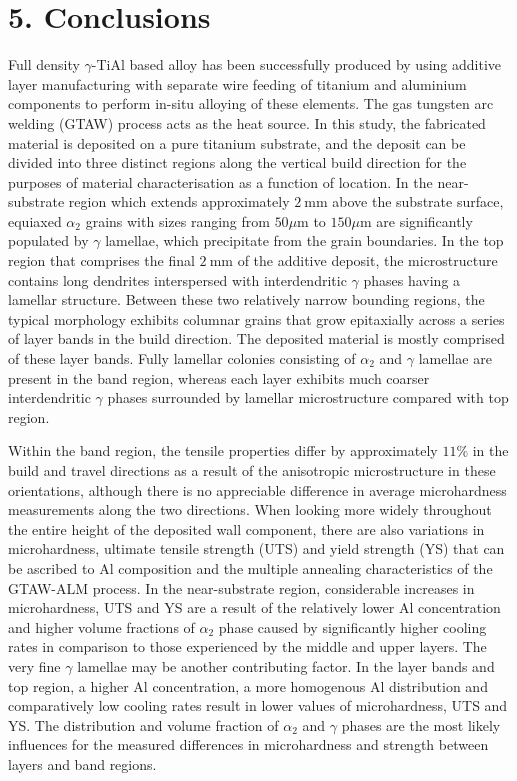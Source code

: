 \documentclass[10pt]{article}
\begin{document}
\section*{5. Conclusions}
Full density $\gamma$-TiAl based alloy has been successfully produced by using additive layer manufacturing with separate wire feeding of titanium and aluminium components to perform in-situ alloying of these elements. The gas tungsten arc welding (GTAW) process acts as the heat source. In this study, the fabricated material is deposited on a pure titanium substrate, and the deposit can be divided into three distinct regions along the vertical build direction for the purposes of material characterisation as a function of location. In the near-substrate region which extends approximately $2 \mathrm{~mm}$ above the substrate surface, equiaxed $\alpha_{2}$ grains with sizes ranging from $50 \mu \mathrm{m}$ to $150 \mu \mathrm{m}$ are significantly populated by $\gamma$ lamellae, which precipitate from the grain boundaries. In the top region that comprises the final $2 \mathrm{~mm}$ of the additive deposit, the microstructure contains long dendrites interspersed with interdendritic $\gamma$ phases having a lamellar structure. Between these two relatively narrow bounding regions, the typical morphology exhibits columnar grains that grow epitaxially across a series of layer bands in the build direction. The deposited material is mostly comprised of these layer bands. Fully lamellar colonies consisting of $\alpha_{2}$ and $\gamma$ lamellae are present in the band region, whereas each layer exhibits much coarser interdendritic $\gamma$ phases surrounded by lamellar microstructure compared with top region.

Within the band region, the tensile properties differ by approximately $11 \%$ in the build and travel directions as a result of the anisotropic microstructure in these orientations, although there is no appreciable difference in average microhardness measurements along the two directions. When looking more widely throughout the entire height of the deposited wall component, there are also variations in microhardness, ultimate tensile strength (UTS) and yield strength (YS) that can be ascribed to $\mathrm{Al}$ composition and the multiple annealing characteristics of the GTAW-ALM process. In the near-substrate region, considerable increases in microhardness, UTS and YS are a result of the relatively lower $\mathrm{Al}$ concentration and higher volume fractions of $\alpha_{2}$ phase caused by significantly higher cooling rates in comparison to those experienced by the middle and upper layers. The very fine $\gamma$ lamellae may be another contributing factor. In the layer bands and top region, a higher $\mathrm{Al}$ concentration, a more homogenous Al distribution and comparatively low cooling rates result in lower values of microhardness, UTS and YS. The distribution and volume fraction of $\alpha_{2}$ and $\gamma$ phases are the most likely influences for the measured differences in microhardness and strength between layers and band regions.
\end{document}
